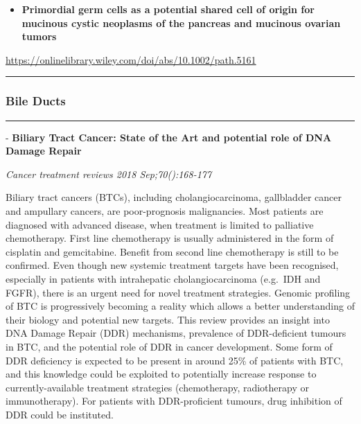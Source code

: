 \documentclass[]{article}
\providecommand{\tightlist}{%
  \setlength{\itemsep}{0pt}\setlength{\parskip}{0pt}}
\begin{document}
\begin{itemize}
\tightlist
\item
  \textbf{Primordial germ cells as a potential shared cell of origin for
  mucinous cystic neoplasms of the pancreas and mucinous ovarian tumors}
\end{itemize}

\url{https://onlinelibrary.wiley.com/doi/abs/10.1002/path.5161}

\begin{center}\rule{0.5\linewidth}{\linethickness}\end{center}

\hypertarget{bile-ducts-3}{%
\subsubsection{Bile Ducts}\label{bile-ducts-3}}

\begin{center}\rule{0.5\linewidth}{\linethickness}\end{center}

 - \textbf{Biliary Tract Cancer: State of the Art and potential role of
DNA Damage Repair}

\emph{Cancer treatment reviews 2018 Sep;70():168-177}

Biliary tract cancers (BTCs), including cholangiocarcinoma, gallbladder
cancer and ampullary cancers, are poor-prognosis malignancies. Most
patients are diagnosed with advanced disease, when treatment is limited
to palliative chemotherapy. First line chemotherapy is usually
administered in the form of cisplatin and gemcitabine. Benefit from
second line chemotherapy is still to be confirmed. Even though new
systemic treatment targets have been recognised, especially in patients
with intrahepatic cholangiocarcinoma (e.g.~IDH and FGFR), there is an
urgent need for novel treatment strategies. Genomic profiling of BTC is
progressively becoming a reality which allows a better understanding of
their biology and potential new targets. This review provides an insight
into DNA Damage Repair (DDR) mechanisms, prevalence of DDR-deficient
tumours in BTC, and the potential role of DDR in cancer development.
Some form of DDR deficiency is expected to be present in around 25\% of
patients with BTC, and this knowledge could be exploited to potentially
increase response to currently-available treatment strategies
(chemotherapy, radiotherapy or immunotherapy). For patients with
DDR-proficient tumours, drug inhibition of DDR could be instituted.
\end{document}
